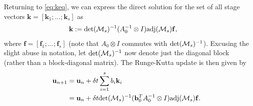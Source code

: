\documentclass[review]{siamart}
\begin{document}
Returning to \eqref{eq:keq}, we can express the direct solution for the set of all
stage vectors ${\mathbf{k}} = [\mathbf{k}_1; ...; \mathbf{k}_s]$ as
%
\begin{align*}
\mathbf{k} &:= \textnormal{det}(\mathcal{M}_s)^{-1}
	(A_0^{-1}\otimes I)\textnormal{adj}(\mathcal{M}_s)\mathbf{f},
\end{align*}
%
where $\mathbf{f} = [\mathbf{f}_1; ...; \mathbf{f}_s]$ (note that
$A_0\otimes I$ commutes with $\textnormal{det}(\mathcal{M}_s)^{-1}$). Excusing the slight
abuse in notation, let $\textnormal{det}(\mathcal{M}_s)^{-1}$ now denote just the diagonal
block (rather than a block-diagonal matrix). The Runge-Kutta update is then given by
%
\begin{align}\nonumber
\mathbf{u}_{n+1} & = \mathbf{u}_n + \delta t\sum_{i=1}^s b_i{\mathbf{k}}_i \\
& = \mathbf{u}_n + \delta t\textnormal{det}(\mathcal{M}_s)^{-1}
	(\mathbf{b}_0^TA_0^{-1}\otimes I)\textnormal{adj}(\mathcal{M}_s)\mathbf{f}.\label{eq:update2}
\end{align}
%
\end{document}
